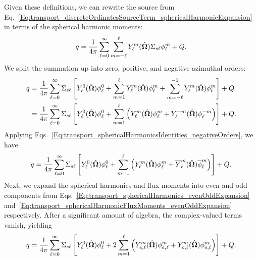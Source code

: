 Given these definitions, we can rewrite the source from Eq.~\eqref{Eq:transport_discreteOrdinatesSourceTerm_sphericalHarmonicExpansion} in terms of the spherical harmonic moments:
\begin{align}
  q = \frac{1}{4\pi} \sum_{\ell = 0}^\infty \sum_{m=-\ell}^\ell Y_\ell^m (\hat{\mathbf{\Omega}}) \Sigma_{s\ell} \phi_\ell^m + Q.
\end{align}
We split the summation up into zero, positive, and negative azimuthal orders:
\begin{align}
  q &= \frac{1}{4\pi} \sum_{\ell = 0}^\infty \Sigma_{s\ell} \left[ Y_\ell^0 (\hat{\mathbf{\Omega}})  \phi_\ell^0 +  \sum_{m=1}^\ell Y_\ell^m (\hat{\mathbf{\Omega}})  \phi_\ell^m + \sum_{m=-\ell}^{-1} Y_\ell^m (\hat{\mathbf{\Omega}})  \phi_\ell^m \right] + Q \nonumber \\
  &= \frac{1}{4\pi} \sum_{\ell = 0}^\infty \Sigma_{s\ell} \left[ Y_\ell^0 (\hat{\mathbf{\Omega}})  \phi_\ell^0 +  \sum_{m=1}^\ell \left( Y_\ell^m (\hat{\mathbf{\Omega}})  \phi_\ell^m + Y_\ell^{-m} (\hat{\mathbf{\Omega}})  \phi_\ell^{-m} \right) \right] + Q .
\end{align}
Applying Eqs.~\eqref{Eq:transport_sphericalHarmonicsIdentities_negativeOrders}, we have
\begin{align}
  q = \frac{1}{4\pi} \sum_{\ell = 0}^\infty \Sigma_{s\ell} \left[ Y_\ell^0 (\hat{\mathbf{\Omega}})  \phi_\ell^0 +  \sum_{m=1}^\ell \left( Y_\ell^m (\hat{\mathbf{\Omega}})  \phi_\ell^m + \overline{Y}_\ell^{m} (\hat{\mathbf{\Omega}})  \overline{\phi}_\ell^{m} \right) \right] + Q .
\end{align}
Next, we expand the spherical harmonics and flux moments into even and odd components from Eqs.~\eqref{Eq:transport_sphericalHarmonics_evenOddExpansion} and~\eqref{Eq:transport_sphericalHarmonicFluxMoments_evenOddExpansion} respectively. After a significant amount of algebra, the complex-valued terms vanish, yielding
\begin{align}
  q = \frac{1}{4\pi} \sum_{\ell = 0}^\infty \Sigma_{s\ell} \left[ Y_\ell^0 (\hat{\mathbf{\Omega}})  \phi_\ell^0 + 2 \sum_{m=1}^\ell \left( Y_{e,\ell}^m (\hat{\mathbf{\Omega}})  \phi_{e,\ell}^m + Y_{o,\ell}^{m} (\hat{\mathbf{\Omega}}) \phi_{o,\ell}^{m} \right) \right] + Q .
\end{align}

